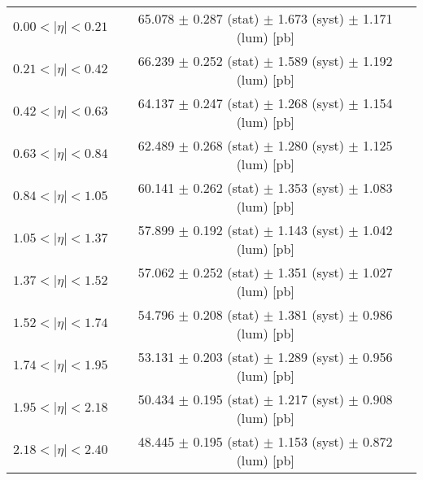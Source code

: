 \begin{tabular}{lc}
\hline
$0.00 < |\eta| <0.21$          & 65.078 $\pm$ 0.287 (stat) $\pm$ 1.673 (syst) $\pm$ 1.171 (lum) [pb]  \\
$0.21 < |\eta| <0.42$          & 66.239 $\pm$ 0.252 (stat) $\pm$ 1.589 (syst) $\pm$ 1.192 (lum) [pb]  \\
$0.42 < |\eta| <0.63$          & 64.137 $\pm$ 0.247 (stat) $\pm$ 1.268 (syst) $\pm$ 1.154 (lum) [pb]  \\
$0.63 < |\eta| <0.84$          & 62.489 $\pm$ 0.268 (stat) $\pm$ 1.280 (syst) $\pm$ 1.125 (lum) [pb]  \\
$0.84 < |\eta| <1.05$          & 60.141 $\pm$ 0.262 (stat) $\pm$ 1.353 (syst) $\pm$ 1.083 (lum) [pb]  \\
$1.05 < |\eta| <1.37$          & 57.899 $\pm$ 0.192 (stat) $\pm$ 1.143 (syst) $\pm$ 1.042 (lum) [pb]  \\
$1.37 < |\eta| <1.52$          & 57.062 $\pm$ 0.252 (stat) $\pm$ 1.351 (syst) $\pm$ 1.027 (lum) [pb]  \\
$1.52 < |\eta| <1.74$          & 54.796 $\pm$ 0.208 (stat) $\pm$ 1.381 (syst) $\pm$ 0.986 (lum) [pb]  \\
$1.74 < |\eta| <1.95$          & 53.131 $\pm$ 0.203 (stat) $\pm$ 1.289 (syst) $\pm$ 0.956 (lum) [pb]  \\
$1.95 < |\eta| <2.18$          & 50.434 $\pm$ 0.195 (stat) $\pm$ 1.217 (syst) $\pm$ 0.908 (lum) [pb]  \\
$2.18 < |\eta| <2.40$          & 48.445 $\pm$ 0.195 (stat) $\pm$ 1.153 (syst) $\pm$ 0.872 (lum) [pb]  \\
\hline
\end{tabular}
